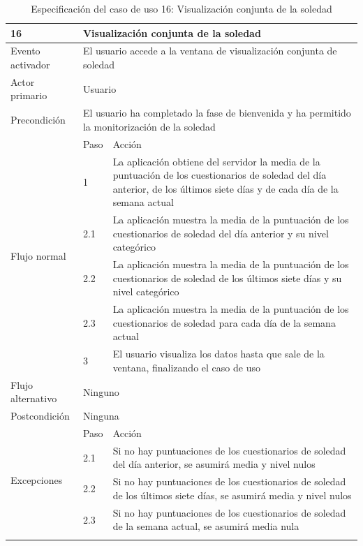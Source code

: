     \begin{table}[h]
        \centering
        \begin{tabularx}{\textwidth}{|l|l|X|}
            \hline
            16 & \multicolumn{2}{|X|}{Visualización conjunta de la soledad} \\
            \hline
            Evento activador & \multicolumn{2}{|X|}{El usuario accede a la ventana de visualización conjunta de soledad} \\
            \hline
            Actor primario & \multicolumn{2}{|X|}{Usuario} \\
            \hline
            Precondición & \multicolumn{2}{|X|}{El usuario ha completado la fase de bienvenida y ha permitido la monitorización de la soledad} \\
            \hline
            \multirow{6}{*}{Flujo normal} & Paso & Acción \\
            \cline{2-3} & 1 & La aplicación obtiene del servidor la media de la puntuación de los cuestionarios de soledad del día anterior, de los últimos siete días y de cada día de la semana actual \\
            \cline{2-3} & 2.1 & La aplicación muestra la media de la puntuación de los cuestionarios de soledad del día anterior y su nivel categórico \\
            \cline{2-3} & 2.2 & La aplicación muestra la media de la puntuación de los cuestionarios de soledad de los últimos siete días y su nivel categórico \\
            \cline{2-3} & 2.3 & La aplicación muestra la media de la puntuación de los cuestionarios de soledad para cada día de la semana actual \\
            \cline{2-3} & 3 & El usuario visualiza los datos hasta que sale de la ventana, finalizando el caso de uso \\
            \hline
            Flujo alternativo & \multicolumn{2}{|X|}{Ninguno} \\
            \hline
            Postcondición & \multicolumn{2}{|X|}{Ninguna} \\
            \hline
            \multirow{4}{*}{Excepciones}  & Paso & Acción \\
            \cline{2-3} & 2.1 & Si no hay puntuaciones de los cuestionarios de soledad del día anterior, se asumirá media y nivel nulos \\
            \cline{2-3} & 2.2 & Si no hay puntuaciones de los cuestionarios de soledad de los últimos siete días, se asumirá media y nivel nulos \\
            \cline{2-3} & 2.3 & Si no hay puntuaciones de los cuestionarios de soledad de la semana actual, se asumirá media nula \\
            \hline
            \caption{Especificación del caso de uso 16: Visualización conjunta de la soledad}
            \label{tabla:casos_uso:visualizacion_conjunta_soledad}
        \end{tabularx}
    \end{table}

